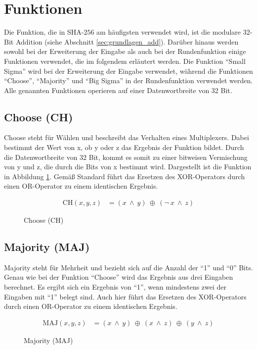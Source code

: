 \section{Funktionen}
\label{sec:sha256:funktionen}

Die Funktion, die in SHA-$256$ am häufigsten verwendet wird, ist die modulare 32-Bit Addition (siehe Abschnitt \ref{sec:grundlagen_add}).
Darüber hinaus werden sowohl bei der Erweiterung der Eingabe als auch bei der Rundenfunktion einige Funktionen verwendet, die im folgendem erläutert werden.
Die Funktion "`Small Sigma"' wird bei der Erweiterung der Eingabe verwendet, während die Funktionen "`Choose"', "`Majority"' und "`Big Sigma"' in der Rundenfunktion
verwendet werden. Alle genannten Funktionen operieren auf einer Datenwortbreite von 32 Bit.


\subsection{Choose (CH)}
Choose steht für Wählen und beschreibt das Verhalten eines Multiplexers. Dabei bestimmt der Wert von x, ob y oder z das Ergebnis der Funktion bildet.
Durch die Datenwortbreite von 32 Bit, kommt es somit zu einer bitweisen Vermischung von y und z, die durch die Bits von x bestimmt wird. Dargestellt
ist die Funktion in Abbildung \ref{eq:ch}. Gemäß Standard \cite[10]{nist1804} führt das Ersetzen des XOR-Operators durch einen OR-Operator zu einem identischen Ergebnis.
\begin{figure}[!h]
  \begin{align}
  \text{CH}( x, y, z) &= (x~\wedge~y)~\oplus~( \neg~x~\wedge~z) \nonumber
  \end{align}
  \caption{Choose (CH)}
  \label{eq:ch}
\end{figure}

\subsection{Majority (MAJ)}
Majority steht für Mehrheit und bezieht sich auf die Anzahl der "`1"' und "`0"' Bits. Genau wie bei der Funktion "`Choose"' wird das Ergebnis aus drei Eingaben berechnet.
Es ergibt sich ein Ergebnis von "`1"', wenn mindestens zwei der Eingaben mit "`1"' belegt sind. Auch hier führt das Ersetzen des XOR-Operators durch einen OR-Operator zu
einem identischen Ergebnis.
\begin{figure}[!h]
  \begin{align}
  \text{MAJ}( x, y, z) &= (x~\wedge~y)~\oplus~(x~\wedge~z)~\oplus~(y~\wedge~z) \nonumber
  \end{align}
  \caption{Majority (MAJ)}
  \label{eq:maj}
\end{figure}

